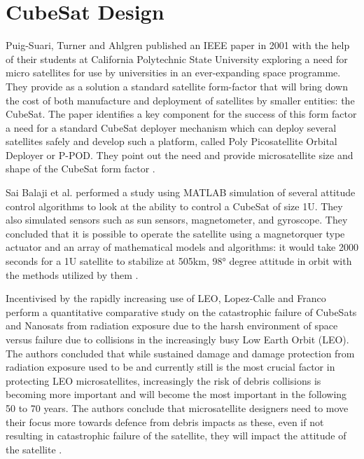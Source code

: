 \section{CubeSat Design}
Puig-Suari, Turner and Ahlgren published an IEEE paper in 2001 with the help of their students at California Polytechnic State University exploring a need for micro satellites for use by universities in an ever-expanding space programme. 
They provide as a solution a standard satellite form-factor that will bring down the cost of both manufacture and deployment of satellites by smaller entities: the CubeSat. 
The paper identifies a key component for the success of this form factor a need for a standard CubeSat deployer mechanism which can deploy several satellites safely and develop such a platform, called Poly Picosatellite Orbital Deployer or P-POD. 
They point out the need and provide microsatellite size and shape of the CubeSat form factor \cite{RefWorks:puig-suari2001development}.

Sai Balaji et al. performed a study using MATLAB simulation of several attitude control algorithms to look at the ability to control a CubeSat of size 1U. 
They also simulated sensors such as sun sensors, magnetometer, and gyroscope. 
They concluded that it is possible to operate the satellite using a magnetorquer type actuator and an array of mathematical models and algorithms: it would take 2000 seconds for a 1U satellite to stabilize at 505km, 98° degree attitude in orbit with the methods utilized by them \cite{RefWorks:balaji2023studies}.

Incentivised by the rapidly increasing use of LEO, Lopez‑Calle and Franco perform a quantitative comparative study on the catastrophic failure of CubeSats and Nanosats from radiation exposure due to the harsh environment of space versus failure due to collisions in the increasingly busy Low Earth Orbit (LEO). 
The authors concluded that while sustained damage and damage protection from radiation exposure used to be and currently still is the most crucial factor in protecting LEO microsatellites, increasingly the risk of debris collisions is becoming more important and will become the most important in the following 50 to 70 years. 
The authors conclude that microsatellite designers need to move their focus more towards defence from debris impacts as these, even if not resulting in catastrophic failure of the satellite, they will impact the attitude of the satellite \cite{RefWorks:lopez-calle2023comparison}.